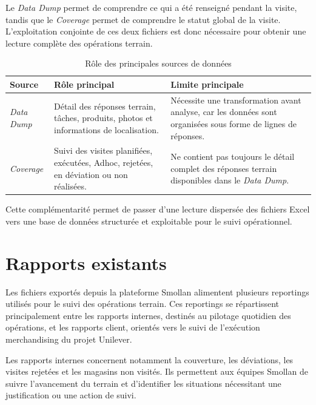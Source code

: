 Le \textit{Data Dump} permet de comprendre ce qui a été renseigné pendant la visite, tandis que le \textit{Coverage} permet de comprendre le statut global de la visite. L’exploitation conjointe de ces deux fichiers est donc nécessaire pour obtenir une lecture complète des opérations terrain.

\begin{table}[H]
\centering
\caption{Rôle des principales sources de données}
\label{tab:sources-data-dump-coverage}
\renewcommand{\arraystretch}{1.25}
\small
\begin{tabularx}{0.95\textwidth}{
|>{\raggedright\arraybackslash}p{2.7cm}
|>{\raggedright\arraybackslash}X
|>{\raggedright\arraybackslash}X|
}
\hline
\textbf{Source} & \textbf{Rôle principal} & \textbf{Limite principale} \\
\hline
\textit{Data Dump}
& Détail des réponses terrain, tâches, produits, photos et informations de localisation.
& Nécessite une transformation avant analyse, car les données sont organisées sous forme de lignes de réponses. \\
\hline
\textit{Coverage}
& Suivi des visites planifiées, exécutées, Adhoc, rejetées, en déviation ou non réalisées.
& Ne contient pas toujours le détail complet des réponses terrain disponibles dans le \textit{Data Dump}. \\
\hline
\end{tabularx}
\end{table}

Cette complémentarité permet de passer d’une lecture dispersée des fichiers Excel vers une base de données structurée et exploitable pour le suivi opérationnel.

\section{Rapports existants}

Les fichiers exportés depuis la plateforme Smollan alimentent plusieurs reportings utilisés pour le suivi des opérations terrain. Ces reportings se répartissent principalement entre les rapports internes, destinés au pilotage quotidien des opérations, et les rapports client, orientés vers le suivi de l’exécution merchandising du projet Unilever.

Les rapports internes concernent notamment la couverture, les déviations, les visites rejetées et les magasins non visités. Ils permettent aux équipes Smollan de suivre l’avancement du terrain et d’identifier les situations nécessitant une justification ou une action de suivi.

